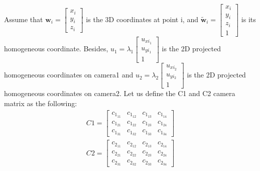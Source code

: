 \begin{your_solution}[title=Q3.2,height=22.5cm,width=\linewidth]
Assume that $\mathbf{w}_i = \begin{bmatrix} x_i \\ y_i \\ z_i \end{bmatrix}$ is the 3D coordinates at point i, and $\tilde{\mathbf{w}}_i = \begin{bmatrix} x_i \\ y_i \\ z_i \\ 1 \end{bmatrix}$ is its homogeneous coordinate. Besides, $u_1 = \lambda_1\begin{bmatrix} u_{xi_{1}} \\ u_{yi_{1}} \\ 1 \end{bmatrix}$ is the 2D projected homogeneous coordinates on camera1 and $u_2 = \lambda_2\begin{bmatrix} u_{xi_{2}} \\ u_{yi_{2}} \\ 1 \end{bmatrix}$ is the 2D projected homogeneous coordinates on camera2. Let us define the C1 and C2 camera matrix as the following:
\begin{align}
	C1 = \begin{bmatrix}
		c_{1_{11}} & c_{1_{12}} & c_{1_{13}} & c_{1_{14}} \\
		c_{1_{21}} & c_{1_{22}} & c_{1_{23}} & c_{1_{24}} \\
		c_{1_{31}} & c_{1_{32}} & c_{1_{33}} & c_{1_{34}}
	\end{bmatrix} \\
	C2 = \begin{bmatrix}
	c_{2_{11}} & c_{2_{12}} & c_{2_{13}} & c_{2_{14}} \\
	c_{2_{21}} & c_{2_{22}} & c_{2_{23}} & c_{2_{24}} \\
	c_{2_{31}} & c_{2_{32}} & c_{2_{33}} & c_{2_{34}}
	\end{bmatrix}

\end{align}
\end{your_solution}
